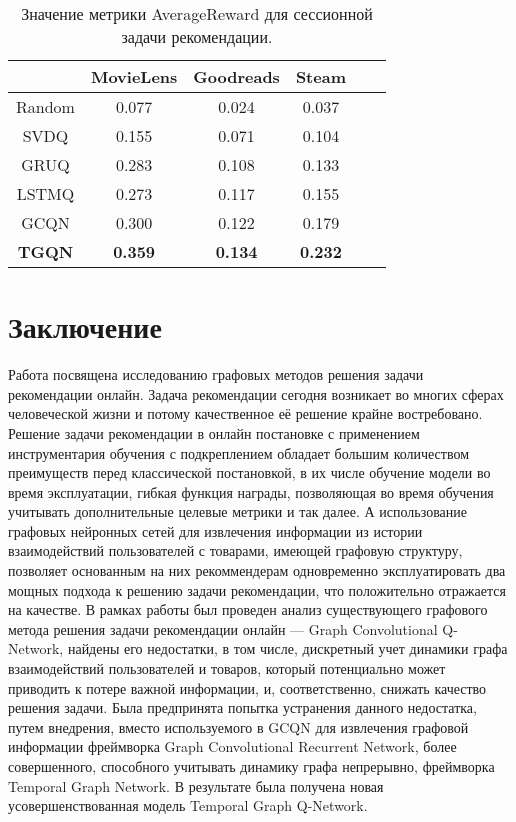 \documentclass[a4paper,14pt,oneside]{mipt-thesis-ms}
\begin{document}
\begin{table}[]
\setlength\tabcolsep{0pt}
\begin{tabular*}{\linewidth}{@{\extracolsep{\fill}} cccccc }
\hline
              & MovieLens      & Goodreads      & Steam          \\ \hline
Random        & 0.077          & 0.024          & 0.037          \\ \hline
SVDQ          & 0.155          & 0.071           & 0.104          \\ \hline
GRUQ          & 0.283          & 0.108          & 0.133          \\ \hline
LSTMQ         & 0.273          & 0.117          & 0.155          \\ \hline
GCQN          & 0.300          & 0.122          & 0.179          \\ \hline
\textbf{TGQN} & \textbf{0.359} & \textbf{0.134} & \textbf{0.232} \\ \hline
\end{tabular*}
\caption{Значение метрики AverageReward для сессионной задачи рекомендации.}
\end{table}


\chapter{Заключение}
Работа посвящена исследованию графовых методов решения задачи рекомендации онлайн. Задача рекомендации сегодня возникает во многих сферах человеческой жизни и потому качественное её решение крайне востребовано. Решение задачи рекомендации в онлайн постановке с применением инструментария обучения с подкреплением обладает большим количеством преимуществ перед классической постановкой, в их числе обучение модели во время эксплуатации, гибкая функция награды, позволяющая во время обучения учитывать дополнительные целевые метрики и так далее. А использование графовых нейронных сетей для извлечения информации из истории взаимодействий пользователей с товарами, имеющей графовую структуру, позволяет основанным на них рекоммендерам одновременно эксплуатировать два мощных подхода к решению задачи рекомендации, что положительно отражается на качестве. 
В рамках работы был проведен анализ существующего графового метода решения задачи рекомендации онлайн --- Graph Convolutional Q-Network, найдены его недостатки, в том числе, дискретный учет динамики графа взаимодействий пользователей и товаров, который потенциально может приводить к потере важной информации, и, соответственно, снижать качество решения задачи. Была предпринята попытка устранения данного недостатка, путем внедрения, вместо используемого в GCQN для извлечения графовой информации фреймворка Graph Convolutional Recurrent Network, более совершенного, способного учитывать динамику графа непрерывно, фреймворка Temporal Graph Network. В результате была получена новая усовершенствованная модель Temporal Graph Q-Network.
\end{document}
